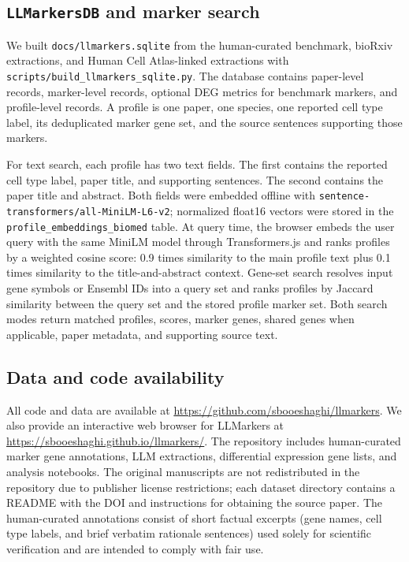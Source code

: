 \documentclass[10pt,twocolumn]{article}
\theoremstyle{plain}
\theoremstyle{definition}
\theoremstyle{remark}
\begin{document}
\subsection{\texttt{LLMarkersDB} and marker search}

We built \texttt{docs/llmarkers.sqlite} from the human-curated benchmark, bioRxiv extractions, and Human Cell Atlas-linked extractions with \texttt{scripts/build\_llmarkers\_sqlite.py}. The database contains paper-level records, marker-level records, optional DEG metrics for benchmark markers, and profile-level records. A profile is one paper, one species, one reported cell type label, its deduplicated marker gene set, and the source sentences supporting those markers.

For text search, each profile has two text fields. The first contains the reported cell type label, paper title, and supporting sentences. The second contains the paper title and abstract. Both fields were embedded offline with \texttt{sentence-transformers/all-MiniLM-L6-v2}; normalized float16 vectors were stored in the \texttt{profile\_embeddings\_biomed} table. At query time, the browser embeds the user query with the same MiniLM model through Transformers.js and ranks profiles by a weighted cosine score: 0.9 times similarity to the main profile text plus 0.1 times similarity to the title-and-abstract context. Gene-set search resolves input gene symbols or Ensembl IDs into a query set and ranks profiles by Jaccard similarity between the query set and the stored profile marker set. Both search modes return matched profiles, scores, marker genes, shared genes when applicable, paper metadata, and supporting source text.

\subsection{Data and code availability}

All code and data are available at \url{https://github.com/sbooeshaghi/llmarkers}. We also provide an interactive web browser for LLMarkers at \url{https://sbooeshaghi.github.io/llmarkers/}. The repository includes human-curated marker gene annotations, LLM extractions, differential expression gene lists, and analysis notebooks. The original manuscripts are not redistributed in the repository due to publisher license restrictions; each dataset directory contains a README with the DOI and instructions for obtaining the source paper. The human-curated annotations consist of short factual excerpts (gene names, cell type labels, and brief verbatim rationale sentences) used solely for scientific verification and are intended to comply with fair use.
\end{document}
